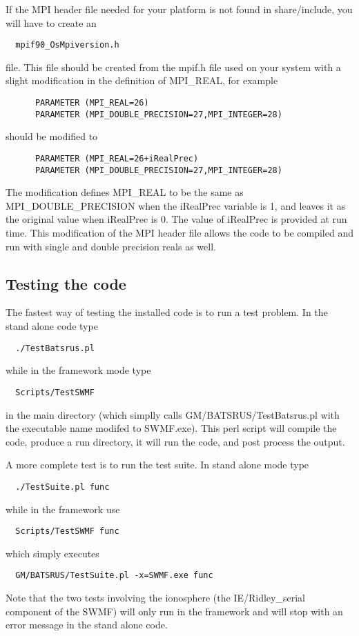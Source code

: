 If the MPI header file needed for your platform is not 
found in share/include, you will have to create an
\begin{verbatim}
  mpif90_OsMpiversion.h
\end{verbatim}
file. This file should be created from the mpif.h file used on your system
with a slight modification in the definition of MPI\_REAL, for example
\begin{verbatim}
      PARAMETER (MPI_REAL=26)
      PARAMETER (MPI_DOUBLE_PRECISION=27,MPI_INTEGER=28)
\end{verbatim}
should be modified to
\begin{verbatim}
      PARAMETER (MPI_REAL=26+iRealPrec)
      PARAMETER (MPI_DOUBLE_PRECISION=27,MPI_INTEGER=28)
\end{verbatim}
The modification defines MPI\_REAL to be the same as MPI\_DOUBLE\_PRECISION
when the iRealPrec variable is 1, and leaves it as the original value
when iRealPrec is 0. The value of iRealPrec is provided at run time.
This modification of the MPI header file allows the code to be compiled 
and run with single and double precision reals as well.

\subsection{Testing the code}

The fastest way of testing the installed code is to run a test problem.
In the stand alone code type
\begin{verbatim}
  ./TestBatsrus.pl
\end{verbatim}
while in the framework mode type
\begin{verbatim}
  Scripts/TestSWMF
\end{verbatim}
in the main directory (which simplly calls GM/BATSRUS/TestBatsrus.pl
with the executable name modifed to SWMF.exe).
This perl script will compile the code, produce a run directory,
it will run the code, and post process the output.

A more complete test is to run the test suite. 
In stand alone mode type
\begin{verbatim}
  ./TestSuite.pl func
\end{verbatim}
while in the framework use
\begin{verbatim}
  Scripts/TestSWMF func
\end{verbatim}
which simply executes
\begin{verbatim}
  GM/BATSRUS/TestSuite.pl -x=SWMF.exe func 
\end{verbatim}
Note that the two tests involving the ionosphere 
(the IE/Ridley\_serial component of the SWMF) will only 
run in the framework and will stop with an error message
in the stand alone code.

